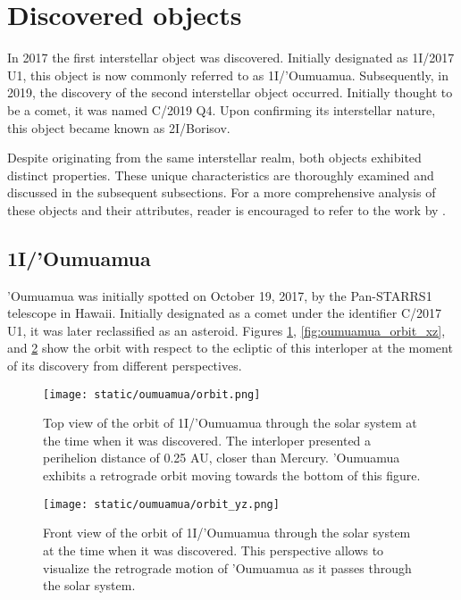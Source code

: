 \section{Discovered objects}

In 2017 the first interstellar object was discovered. Initially designated as
1I/2017 U1, this object is now commonly referred to as 1I/'Oumuamua.
Subsequently, in 2019, the discovery of the second interstellar object occurred.
Initially thought to be a comet, it was named C/2019 Q4. Upon confirming its
interstellar nature, this object became known as 2I/Borisov.

Despite originating from the same interstellar realm, both objects exhibited
distinct properties. These unique characteristics are thoroughly examined and
discussed in the subsequent subsections. For a more comprehensive analysis of
these objects and their attributes, reader is encouraged to refer to the work
by \cite{jewitt2022}.

\subsection{1I/'Oumuamua}

'Oumuamua was initially spotted on October 19, 2017, by the Pan-STARRS1
telescope in Hawaii. Initially designated as a comet under the identifier C/2017
U1, it was later reclassified as an asteroid. Figures \ref{fig:oumuamua_orbit},
\ref{fig:oumuamua_orbit_xz}, and \ref{fig:oumuamua_orbit_yz} show the orbit with
respect to the ecliptic of this interloper at the moment of its discovery from
different perspectives.

\begin{figure}[H]
  \centering
  \texttt{[image: static/oumuamua/orbit.png]}
  \caption[Top view of the orbit of 1I/'Oumuamua through the solar system]{
    Top view of the orbit of 1I/'Oumuamua through the solar system at the time when it was
    discovered. The interloper presented a perihelion distance of 0.25 AU,
    closer than Mercury. 'Oumuamua exhibits a retrograde orbit moving
    towards the bottom of this figure.
  }
  \label{fig:oumuamua_orbit}
\end{figure}

\begin{figure}[H]
  \centering
  \texttt{[image: static/oumuamua/orbit\_yz.png]}
  \caption[Front view of the orbit of 1I/'Oumuamua through the solar system]
  {
    Front view of the orbit of 1I/'Oumuamua through the solar system at the time when it was
    discovered. This perspective allows to visualize the retrograde motion of
    'Oumuamua as it passes through the solar system.
  }
  \label{fig:oumuamua_orbit_yz}
\end{figure}

